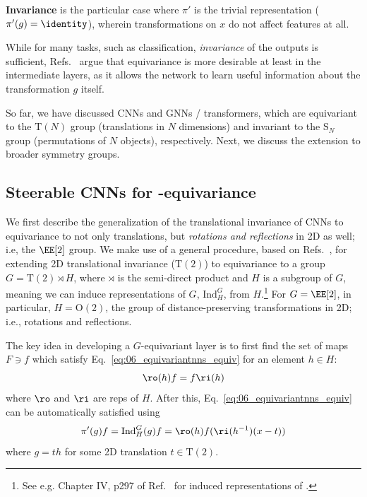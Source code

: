 \begin{definition}
    \textbf{Invariance} is the particular case where $\pi'$ is the trivial representation ($\pi'(g) = \identity$), wherein transformations on $x$ do not affect features at all.
\end{definition}

While for many tasks, such as classification, \textit{invariance} of the outputs is sufficient, Refs.~\cite{worrall2017harmonic, cohen2016steerable} argue that equivariance is more desirable at least in the intermediate layers, as it allows the network to learn useful information about the transformation $g$ itself.

So far, we have discussed CNNs and GNNs / transformers, which are equivariant to the $\mathrm T(N)$ group (translations in $N$ dimensions) and invariant to the $\mathrm S_N$ group (permutations of $N$ objects), respectively.
Next, we discuss the extension to broader symmetry groups.


\subsection{Steerable CNNs for \texorpdfstring{\EE[2]}{E(2)}-equivariance}
\label{sec:06_equivariantnns_e2}

We first describe the generalization of the translational invariance of CNNs to equivariance to not only translations, but \textit{rotations and reflections} in 2D as well; i.e, the $\EE[2]$ group.
We make use of a general procedure, based on Refs.~\cite{cohen2016group, cohen2016steerable}, for extending 2D translational invariance ($\mathrm T(2)$) to equivariance to a group $G =  \mathrm T(2)\rtimes H$, where $\rtimes$ is the semi-direct product and $H$ is a subgroup of $G$, meaning we can induce representations of $G$, $\mathrm{Ind}^G_H$, from $H$.\footnote{See e.g. Chapter IV, p297 of Ref.~\cite{Zee:2016fuk} for induced representations of \EE[2].}
For $G = \EE[2]$, in particular, $H = \mathrm O(2)$, the group of distance-preserving transformations in 2D; i.e., rotations and reflections.

The key idea in developing a $G$-equivariant layer is to first find the set of maps $F \ni f$ which satisfy Eq.~\ref{eq:06_equivariantnns_equiv} for an element $h \in H$:
\begin{equation}\label{eq:06_equivariantnns_equiv2}
    \ro(h)f = f\ri(h)
\end{equation}
where $\ro$ and $\ri$ are reps of $H$. After this, Eq.~\ref{eq:06_equivariantnns_equiv} can be automatically satisfied using
\begin{equation}
    \pi'(g)f = \mathrm{Ind}^G_H(g)f = \ro(h)f(\ri(h^{-1})(x-t))
\end{equation}
where $g = th$ for some 2D translation $t \in \mathrm T(2)$.


